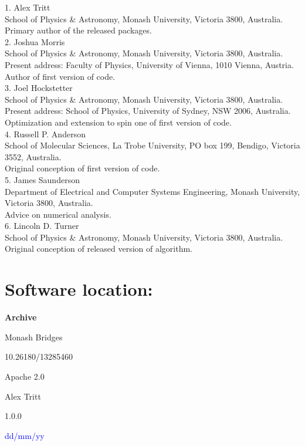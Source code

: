 \documentclass{jors}
\begin{document}
1. Alex Tritt\\
	School of Physics \& Astronomy, Monash University, Victoria 3800, Australia.\\
	Primary author of the released packages.\\
2. Joshua Morris\\
	School of Physics \& Astronomy, Monash University, Victoria 3800, Australia.\\
	Present address: Faculty of Physics, University of Vienna, 1010 Vienna, Austria.\\
	Author of first version of code.\\
3. Joel Hockstetter\\
	School of Physics \& Astronomy, Monash University, Victoria 3800, Australia.\\
	Present address: School of Physics, University of Sydney, NSW 2006, Australia.\\
	Optimization and extension to spin one of first version of code.\\
4. Russell P. Anderson\\
	School of Molecular Sciences, La Trobe University, PO box 199, Bendigo, Victoria 3552, Australia.\\
	Original conception of first version of code.\\
5. James Saunderson\\
	Department of Electrical and Computer Systems Engineering, Monash University, Victoria 3800, Australia.\\
	Advice on numerical analysis.\\
6. Lincoln D. Turner\\
	School of Physics \& Astronomy, Monash University, Victoria 3800, Australia.\\
	Original conception of released version of algorithm.

\section*{Software location:}

{\bf Archive}

\begin{description}[noitemsep,topsep=0pt]
	\item[Name:] Monash Bridges
	\item[Persistent identifier:] 10.26180/13285460
	\item[Licence:] Apache 2.0
	\item[Publisher:]  Alex Tritt
	\item[Version published:] 1.0.0
	\item[Date published:] \textcolor{blue}{dd/mm/yy}
\end{description}
\end{document}
